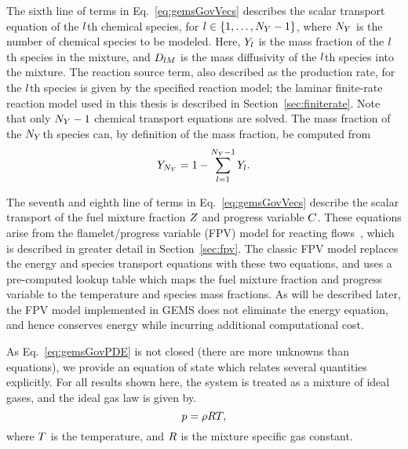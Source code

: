 The sixth line of terms in Eq.~\ref{eq:gemsGovVecs} describes the scalar transport equation of the $l$th chemical species, for $l \in \{1, \hdots, N_Y - 1\}$, where $N_Y$ is the number of chemical species to be modeled. Here, $Y_{l}$ is the mass fraction of the $l$th species in the mixture, and $D_{l M}$ is the mass diffusivity of the $l$th species into the mixture. The reaction source term, also described as the production rate, for the $l$th species is given by the specified reaction model; the laminar finite-rate reaction model used in this thesis is described in Section~\ref{sec:finiterate}. Note that only $N_Y - 1$ chemical transport equations are solved. The mass fraction of the $N_Y$th species can, by definition of the mass fraction, be computed from
%
\begin{equation}
	Y_{N_Y} = 1 - \sum_{l = 1}^{N_Y-1} Y_{l}.
\end{equation}

The seventh and eighth line of terms in Eq.~\ref{eq:gemsGovVecs} describe the scalar transport of the fuel mixture fraction $Z$ and progress variable $C$. These equations arise from the flamelet/progress variable (FPV) model for reacting flows~\cite{Pierce2001}, which is described in greater detail in Section~\ref{sec:fpv}. The classic FPV model replaces the energy and species transport equations with these two equations, and uses a pre-computed lookup table which maps the fuel mixture fraction and progress variable to the temperature and species mass fractions. As will be described later, the FPV model implemented in GEMS does not eliminate the energy equation, and hence conserves energy while incurring additional computational cost.

As Eq.~\ref{eq:gemsGovPDE} is not closed (there are more unknowns than equations), we provide an equation of state which relates several quantities explicitly. For all results shown here, the system is treated as a mixture of ideal gases, and the ideal gas law is given by.
%
\begin{equation}\label{eq:idealGas}
	p = \rho R T,
\end{equation}
%
where $T$ is the temperature, and $R$ is the mixture specific gas constant.

